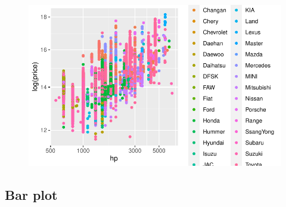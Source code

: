 \documentclass[
  letterpaper,
  DIV=11,
  numbers=noendperiod]{scrartcl}
\begin{document}
\begin{figure}[H]

{\centering \includegraphics[width=17.1875in,height=\textheight]{pakwheels_files/figure-pdf/unnamed-chunk-35-2.pdf}

}

\end{figure}

\hypertarget{bar-plot}{%
\subsection{Bar plot}\label{bar-plot}}
\end{document}
